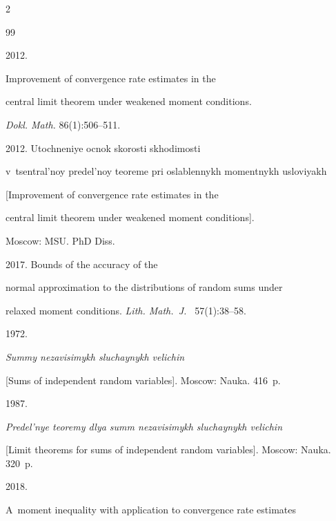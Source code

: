 \begin{multicols}{2}
{{\begin{thebibliography}{99}


 2012. 


Improvement of convergence rate estimates in the 


central limit theorem under weakened moment conditions.


\textit{Dokl. Math.} 86(1):506--511.







 2012. Utochneniye ocnok skorosti skhodimosti 


v~tsentral'noy predel'noy teoreme pri  oslablennykh momentnykh usloviyakh


[Improvement of convergence rate estimates in the 


central limit theorem under weakened moment conditions]. 


 Moscow: MSU. PhD Diss.







 2017. Bounds of the accuracy of the


normal approximation to the distributions of random sums under


relaxed moment conditions. \textit{Lith. Math.~J.~} 57(1):38--58.







 1972. 


\textit{Summy nezavisimykh sluchaynykh velichin} 


[Sums of independent random variables]. Moscow: Nauka. 416~p.







 1987. 


\textit{Predel'nye teoremy dlya summ ne\-za\-vi\-si\-mykh sluchaynykh velichin} 


[Limit theorems for sums of independent random variables]. Moscow: Nauka. 320~p.







 2018. 


A~moment inequality with application to convergence rate estimates 



\end{thebibliography}}}
\end{multicols}
